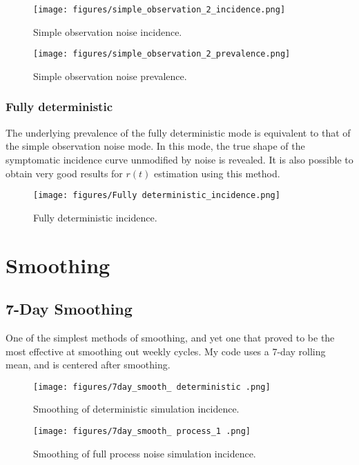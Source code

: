 \documentclass{article}
\begin{document}
\begin{figure}[h!]
    \centering
    \texttt{[image: figures/simple\_observation\_2\_incidence.png]}
    \caption{Simple observation noise incidence.}
\end{figure}

\clearpage
\begin{figure}[h!]
    \centering
    \texttt{[image: figures/simple\_observation\_2\_prevalence.png]}
    \caption{Simple observation noise prevalence.}
\end{figure}

\subsubsection{Fully deterministic}
The underlying prevalence of the fully deterministic mode is equivalent to that of the simple observation noise mode. In this mode, the true shape of the symptomatic incidence curve unmodified by noise is revealed. It is also possible to obtain very good results for $r(t)$ estimation using this method.

\clearpage
\begin{figure}[h!]
    \centering
    \texttt{[image: figures/Fully deterministic\_incidence.png]}
    \caption{Fully deterministic incidence.}
\end{figure}


\section{Smoothing}

\subsection{7-Day Smoothing}
One of the simplest methods of smoothing, and yet one that proved to be the most effective at smoothing out weekly cycles. My code uses a 7-day rolling mean, and is centered after smoothing.

\clearpage
\begin{figure}[h!]
    \centering
    \texttt{[image: figures/7day\_smooth\_ deterministic .png]}
    \caption{Smoothing of deterministic simulation incidence.}
\end{figure}


\clearpage
\begin{figure}[h!]
    \centering
    \texttt{[image: figures/7day\_smooth\_ process\_1 .png]}
    \caption{Smoothing of full process noise simulation incidence.}
\end{figure}
\end{document}
